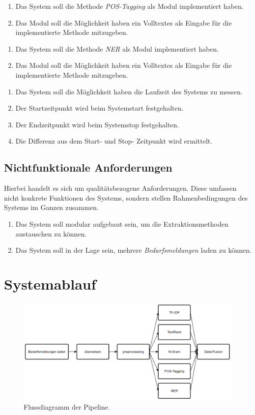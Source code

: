 \begin{enumerate}[label=7.\arabic*]
	\item Das System soll die Methode \emph{POS-Tagging} als Modul implementiert haben.
	\item Das Modul soll die Möglichkeit haben ein Volltextes als Eingabe für die implementierte Methode mitzugeben.
\end{enumerate}
\begin{enumerate}[label=8.\arabic*]
	\item Das System soll die Methode \emph{NER} als Modul implementiert haben.
	\item Das Modul soll die Möglichkeit haben ein Volltextes als Eingabe für die implementierte Methode mitzugeben.
\end{enumerate}
\begin{enumerate}[label=8.\arabic*]
	\item Das System soll die Möglichkeit haben die Laufzeit des Systems zu messen.
	\item Der Startzeitpunkt wird beim Systemstart festgehalten.
	\item Der Endzeitpunkt wird beim Systemstop festgehalten.
	\item Die Differenz aus dem Start- und Stop- Zeitpunkt wird ermittelt.
\end{enumerate}
\subsection{Nichtfunktionale Anforderungen}
Hierbei handelt es sich um qualitätsbezogene Anforderungen. Diese umfassen nicht konkrete Funktionen des Systems, sondern stellen Rahmenbedingungen des Systems im Ganzen zusammen.
\begin{enumerate}
	\item Das System soll modular aufgebaut sein, um die Extraktionsmethoden austauschen zu können.
	\item Das System soll in der Lage sein, mehrere \emph{Bedarfsmeldungen} laden zu können.
\end{enumerate}
\newpage
\section{Systemablauf}
\begin{figure}[H]
	\centering  
	\includegraphics[width=\linewidth]{Abbildungen/flowchart.png}
	\caption{Flussdiagramm der Pipeline.}
	\label{fig:flowchart}
\end{figure}\mbox{} \\
\newpage
